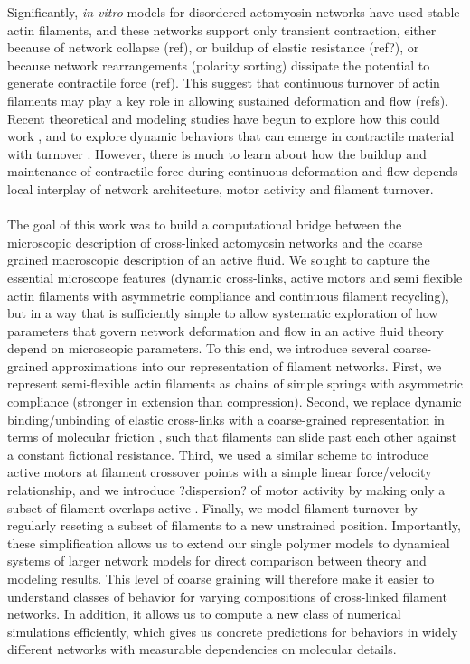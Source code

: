 \documentclass[10pt,letterpaper]{article}
\begin{document}
Significantly, {\em in vitro} models for disordered actomyosin networks have used stable actin filaments, and these networks  support only transient contraction, either because of network collapse (ref), or buildup of elastic resistance (ref?), or because network rearrangements (polarity sorting) dissipate the potential to generate contractile force (ref). This suggest that continuous turnover of actin filaments may play a key role in allowing sustained deformation and flow (refs). Recent theoretical and modeling studies have begun to explore how this could work \cite{2015arXiv150706182H,Mak:2016aa,10.1371/journal.pone.0000696}, and to explore dynamic behaviors that can emerge in contractile material with turnover \cite{PhysRevLett.113.148102}. However, there is much to learn about how the buildup and maintenance of contractile force during continuous deformation and flow depends local interplay of network architecture, motor activity and filament turnover.

\paragraph{}  The goal of this work was to build a computational bridge between the microscopic description of cross-linked actomyosin networks and the coarse grained macroscopic description of an active fluid.  We sought to capture the essential microscope features (dynamic cross-links, active motors and semi flexible actin filaments with asymmetric compliance and continuous filament recycling), but in a way that is sufficiently simple to allow systematic exploration of how parameters that govern network deformation and flow in an active fluid theory depend on microscopic parameters. To this end, we introduce several coarse-grained approximations into our representation of filament networks. First, we represent semi-flexible actin filaments as chains of simple springs with asymmetric compliance (stronger in extension than compression). Second, we replace  dynamic binding/unbinding of elastic cross-links with a coarse-grained representation in terms of molecular friction \cite{theo_friction,theo_frictionSam,theo_molefric}, such that filaments can slide past each other against a constant fictional resistance. Third, we used a similar scheme to introduce active motors at filament crossover points with a simple linear force/velocity relationship, and we introduce ?dispersion? of motor activity by making only a subset of filament overlaps active \cite{theo_frictionShila}.  Finally, we model filament turnover by regularly reseting a subset of filaments to a new unstrained position. Importantly, these simplification allows us to extend our single polymer models to dynamical systems of larger network models for direct comparison between theory and modeling results. This level of coarse graining will therefore make it easier to understand classes of behavior for varying compositions of cross-linked filament networks. In addition, it allows us to compute a new class of numerical simulations efficiently, which gives us concrete predictions for behaviors in widely different networks with measurable dependencies on molecular details. 
  
\end{document}
